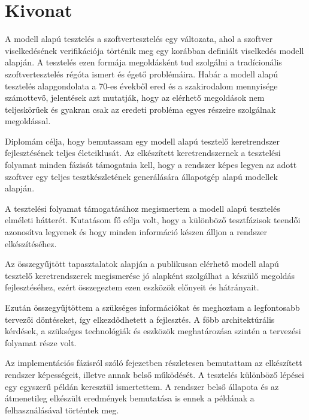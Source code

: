 \setcounter{page}{1}

\hungarianParagraph


\chapter*{Kivonat}
\label{cha:kivonat}

A modell alapú tesztelés a szoftvertesztelés egy változata, ahol a szoftver viselkedésének verifikációja történik meg egy korábban definiált viselkedés modell alapján. A tesztelés ezen formája megoldásként tud szolgálni a tradícionális szoftvertesztelés régóta ismert és égető problémáira. Habár a modell alapú tesztelés alapgondolata a 70-es évekből ered és a szakirodalom mennyisége számottevő, jelentések azt mutatják, hogy az elérhető megoldások nem teljeskörűek és gyakran csak az eredeti probléma egyes részeire szolgálnak megoldással.

Diplomám célja, hogy bemutassam egy modell alapú tesztelő keretrendszer fejlesztésének teljes életciklusát. Az elkészített keretrendszernek a tesztelési folyamat minden fázisát támogatnia kell, hogy a rendszer képes legyen az adott szoftver egy teljes tesztkészletének generálására állapotgép alapú modellek alapján.

A tesztelési folyamat támogatásához megismertem a modell alapú tesztelés elméleti hátterét. Kutatásom fő célja volt, hogy a különböző tesztfázisok teendői azonosítva legyenek és hogy minden információ készen álljon a rendszer elkészítéséhez.

Az összegyűjtött tapasztalatok alapján a publikusan elérhető modell alapú tesztelő keretrendszerek megismerése jó alapként szolgálhat a készülő megoldás fejlesztéséhez, ezért összegeztem ezen eszközök előnyeit és hátrányait.

Ezután összegyűjtöttem a szükséges információkat és meghoztam a legfontosabb tervezői döntéseket, így elkezdődhetett a fejlesztés. A főbb architektúrális kérdések, a szükséges technológiák és eszközök meghatározása szintén a tervezési folyamat része volt.

Az implementációs fázisról szóló fejezetben részletesen bemutattam az elkészített rendszer képességeit, illetve annak belső működését. A tesztelés különböző lépései egy egyszerű példán keresztül ismertettem. A rendszer belső állapota és az átmenetileg elkészült eredmények bemutatása is ennek a példának a felhasználásával történtek meg.

